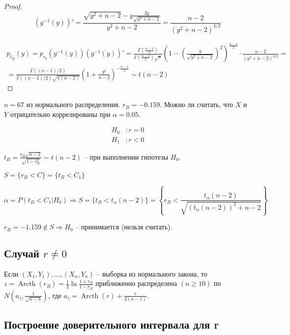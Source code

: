 \begin{corollary*}
\begin{proof}
  \[
    (g^{-1} (y))' = \frac{\sqrt{y^2+n-2} - y \frac{2y}{\sqrt{y^2+n-2}} }{y^2+n-2} = \frac{n-2}{(y^2 + n - 2)^{3/2}}
  \]

  \begin{multline*}
    p_{t_B} (y) = p_{r_b} (g^{-1}(y)) (g^{-1}(y))'
    = \frac{\Gamma(\frac{n-1}{2})}{\Gamma(\frac{n-2}{2}) \sqrt{\pi}}
    (1-(\frac{y}{\sqrt{y^2+n-2}})^2)^{\frac{n-4}{2}} \cdot
    \frac{n-2}{(y^2 + n - 2)^{3/2}} = \\
    = \frac{\Gamma\left((n-1)/2\right)}{\Gamma\left((n-2)/2\right) \sqrt{\pi (n-2)}} \left(1 + \frac{y^2}{n-2}\right)^{-\frac{n-1}{2}} \sim t(n-2)
  \end{multline*}
\end{proof}

\begin{ex}
  $n=67$ из нормального распределения. $r_B = -0.159$. Можно ли считать, что $X$ и $Y$ отрицательно коррелированы при $\alpha = 0.05$.

  \begin{align*}
    H_0 &: r = 0 \\
    H_1 &: r < 0
  \end{align*}

  $t_B = \frac{r_B \sqrt{n-2}}{\sqrt{1-r_B^2}} \sim t(n-2)$ -- при выполнении гипотезы $H_0$.

  $S = \{r_B < C\} = \{ t_B < C_1\}$

  \[
    \alpha = P(t_B < C_1 | H_0) \Rightarrow S = \{ t_B < t_\alpha (n-2) \} = 
    \left\{ r_B < \frac{t_\alpha (n-2)}{\sqrt{ (t_\alpha(n-2))^2 + n-2 }}\right\}
  \]

  $r_B = -1.159 \notin S \Rightarrow H_0$ -- принимается (нельзя считать). 
\end{ex}

\subsection{Случай $r \neq 0$}

\begin{theorem}[Фишера]
  Если $(X_1, Y_1), \dots, (X_n, Y_n)$ -- выборка из нормального закона, то
  $z = \operatorname{Arcth} (r_B) = \frac{1}{2} \ln \frac{1 + r_B}{1 - r_B}$
  приближенно распределена $(n \geqslant 10)$ по
  $N\left(a_z, \frac{1}{\sqrt{n-3}}\right)$, где
  $a_z = \operatorname{Arcth} (r) + \frac{r}{2(n-1)}$.
\end{theorem}

\subsection{Построение доверительного интервала для r}


\end{corollary*}
